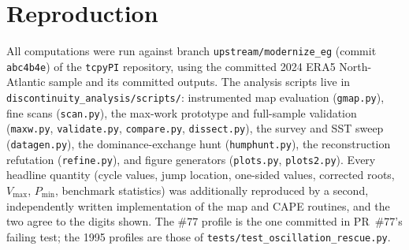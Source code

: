 \documentclass[11pt,a4paper]{article}
\theoremstyle{definition}
\begin{document}
\section{Reproduction}\label{app:repro}

All computations were run against branch \texttt{upstream/modernize\_eg}
(commit \texttt{abc4b4e}) of the \texttt{tcpyPI} repository, using the
committed 2024 ERA5 North-Atlantic sample and its committed outputs.  The
analysis scripts live in \texttt{discontinuity\_analysis/scripts/}:
instrumented map evaluation (\texttt{gmap.py}), fine scans
(\texttt{scan.py}), the max-work prototype and full-sample validation
(\texttt{maxw.py}, \texttt{validate.py}, \texttt{compare.py},
\texttt{dissect.py}), the survey and SST sweep (\texttt{datagen.py}), the
dominance-exchange hunt (\texttt{humphunt.py}), the reconstruction
refutation (\texttt{refine.py}), and figure generators (\texttt{plots.py},
\texttt{plots2.py}).  Every headline quantity (cycle values, jump location,
one-sided values, corrected roots, $V_{\max}$, $P_{\min}$, benchmark
statistics) was additionally reproduced by a second, independently written
implementation of the map and CAPE routines, and the two agree to the
digits shown.
The \#77 profile is the one committed in PR~\#77's failing test; the 1995
profiles are those of \texttt{tests/test\_oscillation\_rescue.py}.
\end{document}
